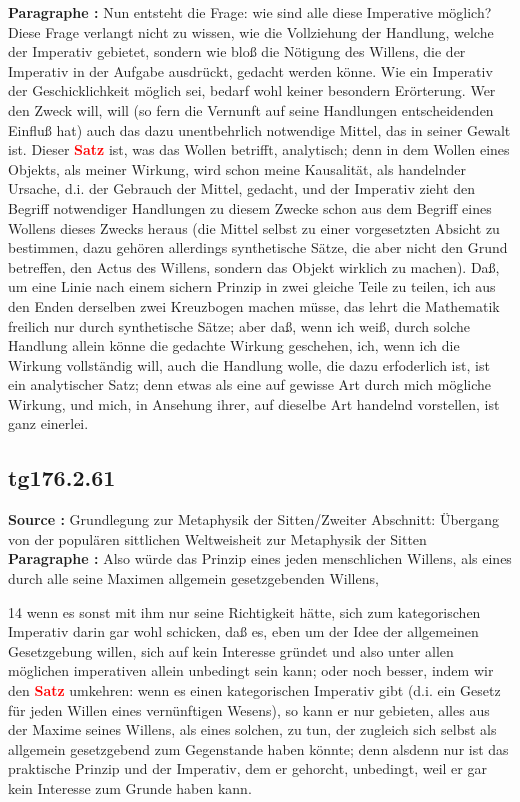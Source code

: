 \documentclass[a4paper,12pt,twoside]{book}
\newcommand{\match}[1]{\textcolor{red}{\textbf{#1}}}
\begin{document}
	\noindent\textbf{Paragraphe : }Nun entsteht die Frage: wie sind alle diese Imperative möglich? Diese Frage verlangt nicht zu wissen, wie die Vollziehung der Handlung, welche der Imperativ gebietet, sondern wie bloß die Nötigung des Willens, die der Imperativ in der Aufgabe ausdrückt, gedacht werden könne. Wie ein Imperativ der Geschicklichkeit möglich sei, bedarf wohl keiner besondern Erörterung. Wer den Zweck will, will (so fern die Vernunft auf seine Handlungen entscheidenden Einfluß hat) auch das dazu unentbehrlich notwendige Mittel, das in seiner Gewalt ist. Dieser \match{Satz} ist, was das Wollen betrifft, analytisch; denn in dem Wollen eines Objekts, als meiner Wirkung, wird schon meine Kausalität, als handelnder Ursache, d.i. der Gebrauch der Mittel, gedacht, und der Imperativ zieht den Begriff notwendiger Handlungen zu diesem Zwecke schon aus dem Begriff eines Wollens dieses Zwecks heraus (die Mittel selbst zu einer vorgesetzten Absicht  zu bestimmen, dazu gehören allerdings synthetische Sätze, die aber nicht den Grund betreffen, den Actus des Willens, sondern das Objekt wirklich zu machen). Daß, um eine Linie nach einem sichern Prinzip in zwei gleiche Teile zu teilen, ich aus den Enden derselben zwei Kreuzbogen machen müsse, das lehrt die Mathematik freilich nur durch synthetische Sätze; aber daß, wenn ich weiß, durch solche Handlung allein könne die gedachte Wirkung geschehen, ich, wenn ich die Wirkung vollständig will, auch die Handlung wolle, die dazu erfoderlich ist, ist ein analytischer Satz; denn etwas als eine auf gewisse Art durch mich mögliche Wirkung, und mich, in Ansehung ihrer, auf dieselbe Art handelnd vorstellen, ist ganz einerlei. 
	
	\subsection*{tg176.2.61} 
	\textbf{Source : }Grundlegung zur Metaphysik der Sitten/Zweiter Abschnitt: Übergang von der populären sittlichen Weltweisheit zur Metaphysik der Sitten\\  
	
	\noindent\textbf{Paragraphe : }Also würde das Prinzip eines jeden menschlichen Willens, als eines durch alle seine Maximen allgemein gesetzgebenden Willens,
	
	
	14
	wenn es sonst mit ihm nur seine Richtigkeit hätte, sich zum kategorischen Imperativ darin gar wohl schicken, daß es, eben um der Idee der allgemeinen Gesetzgebung willen, sich auf kein Interesse gründet und also unter allen möglichen imperativen allein unbedingt sein kann; oder noch besser, indem wir den \match{Satz} umkehren: wenn es einen kategorischen Imperativ gibt (d.i. ein Gesetz für jeden Willen eines vernünftigen Wesens), so kann er nur gebieten, alles aus der Maxime seines Willens, als eines solchen, zu tun, der zugleich sich selbst als allgemein gesetzgebend zum Gegenstande haben könnte; denn alsdenn nur ist das praktische Prinzip und der Imperativ, dem er gehorcht, unbedingt, weil er gar kein Interesse zum Grunde haben kann. 
	
\end{document}

